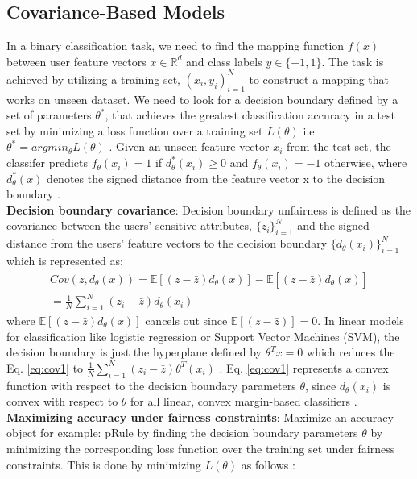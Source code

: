 \documentclass[runningheads]{llncs}
\begin{document}
\subsection{Covariance-Based Models}
In a binary classification task, we need to find the mapping function $f(x)$ between user feature vectors $x \in \mathbb{R}^d$ and class labels $y \in \{-1,1\}$. The task is achieved by utilizing a training set, ${(x_i, y_i)}_{i=1}^N$ to construct a mapping that works on unseen dataset. We need to look for a decision boundary defined by a set of parameters $\theta^*$, that achieves the greatest classification accuracy in a test set by minimizing a loss function over a training set $L(\theta)$ i.e $\theta^* = argmin_\theta L(\theta)$ \cite{zafar2015fairness}. Given an unseen feature vector $x_i$ from the test set, the classifer predicts $f_\theta(x_i) = 1$ if $d_{\theta}^*(x_i) \geq 0$ and $f_\theta(x_i) = -1$ otherwise, where $d_{\theta}^*(x)$ denotes the signed distance from the feature vector x to the decision boundary \cite{zafar2015fairness}.\\
\textbf{Decision boundary covariance}: Decision boundary unfairness is defined as the covariance between the users' sensitive attributes, $\{z_i\}_{i=1}^N$ and the signed distance from the users' feature vectors to the decision boundary $\{d_\theta(x_i)\}_{i=1}^N$ which is represented as:
\begin{equation}
\begin {split}
Cov(z,d_\theta(x)) = \mathbb{E}[(z-\bar{z})d_\theta(x)] - \mathbb{E}[(z-\bar{z})\bar{d}_\theta(x)]\\ 
		           = \frac{1}{N}\sum_{i=1}^N(z_i - \bar{z})d_\theta(x_i)
\end{split}
\label{eq:cov1}
\end{equation}
where $\mathbb{E}[(z-\bar{z})d_\theta(x)]$ cancels out since $\mathbb{E}[(z-\bar{z})] = 0$.
In linear models for classification like logistic regression or Support Vector Machines (SVM), the decision boundary is just the hyperplane defined by $\theta^Tx = 0$ which reduces the Eq. \ref{eq:cov1} to $\frac{1}{N}\sum_{i=1}^N(z_i - \bar{z})\theta^T(x_i)$ \cite{zafar2015fairness}.  Eq. \ref{eq:cov1} represents a convex function with respect to the decision boundary parameters $\theta$, since $d_\theta(x_i)$ is convex with respect to $\theta$ for all linear, convex margin-based classifiers \cite{zafar2015fairness}.\\
\textbf{Maximizing accuracy under fairness constraints}: Maximize an accuracy object for example: pRule by finding the decision boundary parameters $\theta$ by minimizing the corresponding loss function over the training set under fairness constraints. This is done by minimizing $L(\theta)$ as follows :
\end{document}
